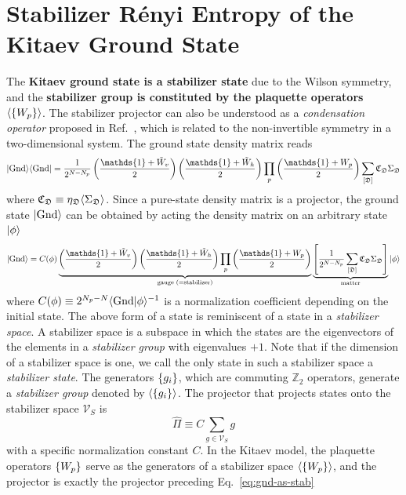 \section{Stabilizer R\'enyi Entropy of the Kitaev Ground State}
The \textbf{Kitaev ground state is a stabilizer state} due to the Wilson symmetry, and the \textbf{stabilizer group is constituted by the plaquette operators} $\langle \left\{ W_p \right\} \rangle$. The stabilizer projector can also be understood as a \textit{condensation operator} proposed in Ref.~\cite{Choi-Sanghavi-Shao-Zheng_2025}, which is related to the non-invertible symmetry in a two-dimensional system. The ground state density matrix reads~\cite{wang2026exactorganizationdensitymatrices}
\[
\ket{\mrm{Gnd}}\bra{\mrm{Gnd}} 
= 
\frac{1}{2^{N-N_p}} 
\lr{\frac{\mathds{1} + \tilde{W}_v}{2}} 
\lr{\frac{\mathds{1} + \tilde{W}_h}{2}}
\prod_{p} \lr{\frac{\mathds{1} + W_p}{2}}
\sum_{[\mathfrak{D}]} \mathfrak{C}_{\mathfrak{D}} \Sigma_{\mathfrak{D}}
\]
where $\mathfrak{C}_\mathfrak{D} \equiv \eta_\mathfrak{D} \langle \Sigma_\mathfrak{D} \rangle$. Since a pure-state density matrix is a projector, the ground state $| \mathrm{Gnd} \rangle$ can be obtained by acting the density matrix on an arbitrary state $| \phi \rangle$
\begin{equation}\label{eq:gnd-as-stab}
    \ket{\mrm{Gnd}}
    =
    C(\phi)
    \underbrace{
    \lr{\frac{\mathds{1} + \tilde{W}_v}{2}} 
    \lr{\frac{\mathds{1} + \tilde{W}_h}{2}}
    \prod_{p} \lr{\frac{\mathds{1} + W_p}{2}}
    }_{\text{gauge ($=$stabilizer)}}
    \underbrace{
    \lrm{
        \frac{1}{2^{N - N_p}}
        \sum_{[\mathfrak{D}]} \mathfrak{C}_{\mathfrak{D}}
        \Sigma_\mathfrak{D}
    }
    }_{\text{matter}}
    \ket{\phi}
\end{equation}
where $C(\phi) \equiv 2^{N_p-N}\langle \mathrm{Gnd} | \phi \rangle^{-1}$ is a normalization coefficient depending on the initial state. The above form of a state is reminiscent of a state in a \textit{stabilizer space}. A stabilizer space is a subspace in which the states are the eigenvectors of the elements in a \textit{stabilizer group} with eigenvalues $+1$. Note that if the dimension of a stabilizer space is one, we call the only state in such a stabilizer space a \textit{stabilizer state}. The generators $\left\{ g_i \right\}$, which are commuting $\mathbb{Z}_2$ operators, generate a \textit{stabilizer group} denoted by $\langle \left\{ g_i \right\} \rangle$. The projector that projects states onto the stabilizer space $\mathcal{V}_S$ is 
\[
\hat{\Pi} \equiv C\sum_{g\in\mathcal{V}_S} g
\]
with a specific normalization constant $C$. In the Kitaev model, the plaquette operators $\left\{ W_p \right\}$ serve as the generators of a stabilizer space $\langle \left\{ W_p \right\} \rangle$, and the projector is exactly the projector preceding Eq.~\eqref{eq:gnd-as-stab}
